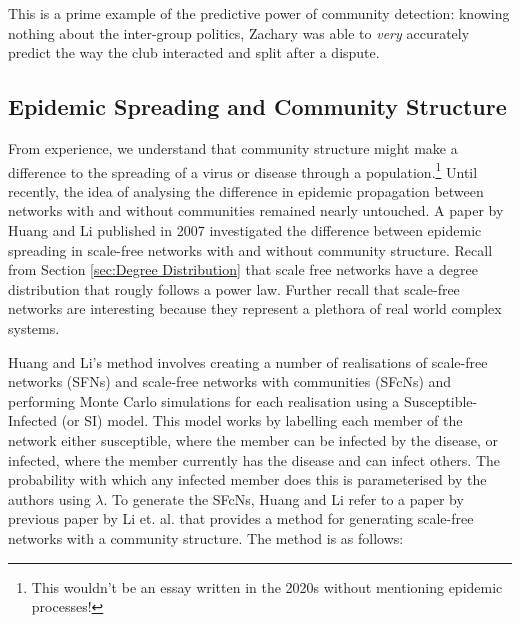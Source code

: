 This is a prime example of the predictive power of community detection: knowing nothing about the inter-group politics, Zachary was able to \emph{very} accurately predict the way the club interacted and split after a dispute.

\subsection{Epidemic Spreading and Community Structure}\label{sec:epidemics}
From experience, we understand that community structure might make a difference to the spreading of a virus or disease through a population.\footnote{This wouldn't be an essay written in the 2020s without mentioning epidemic processes!} Until recently, the idea of analysing the difference in epidemic propagation between networks with and without communities remained nearly untouched. A paper by Huang and Li published in 2007 \cite{Huang_2007} investigated the difference between epidemic spreading in scale-free networks with and without community structure. Recall from Section \ref{sec:Degree Distribution} that scale free networks have a degree distribution that rougly follows a power law. Further recall that scale-free networks are interesting because they represent a plethora of real world complex systems.

Huang and Li's method involves creating a number of realisations of scale-free networks (SFNs) and scale-free networks with communities (SFcNs) and performing Monte Carlo simulations for each realisation using a Susceptible-Infected (or SI) model. This model works by labelling each member of the network either susceptible, where the member can be infected by the disease, or infected, where the member currently has the disease and can infect others. The probability with which any infected member does this is parameterised by the authors using $\lambda$. To generate the SFcNs, Huang and Li refer to a paper by previous paper by Li et. al. \cite{Li_2005} that provides a method for generating scale-free networks with a community structure. The method is as follows:

